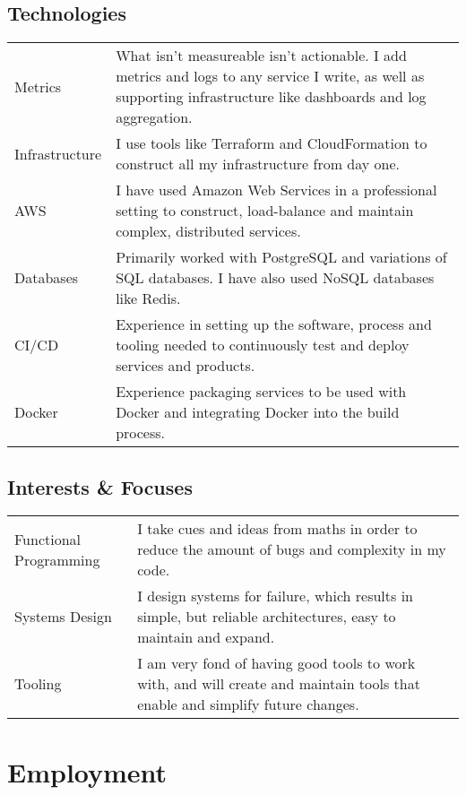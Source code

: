 \documentclass[a4paper]{article}
\begin{document}
\subsection*{Technologies}
\begin{tabular}{ p{3cm} | p{13cm} }
Metrics & What isn't measureable isn't actionable. I add metrics and logs to
any service I write, as well as supporting infrastructure like dashboards and
log aggregation. \\
Infrastructure & I use tools like Terraform and CloudFormation to
construct all my infrastructure from day one. \\
AWS & I have used Amazon Web Services in a professional setting to construct, load-balance and
maintain complex, distributed services. \\
Databases & Primarily worked with PostgreSQL and variations of SQL
databases. I have also used NoSQL databases like Redis. \\
CI/CD & Experience in setting up the software, process and tooling needed
to continuously test and deploy services and products.\\
Docker & Experience packaging services to be used with Docker and
integrating Docker into the build process.
\end{tabular}

\subsection*{Interests \& Focuses}
\begin{tabular}{ p{3cm} | p{13cm} }
Functional \linebreak Programming & I take cues and ideas from maths in order to reduce the
amount of bugs and complexity in my code.\\
Systems Design & I design systems for failure, which results in simple,
but reliable architectures, easy to maintain and expand.\\
Tooling & I am very fond of having good tools to work with, and will create and
maintain tools that enable and simplify future changes. \\
\end{tabular}

\section*{Employment}
\end{document}
